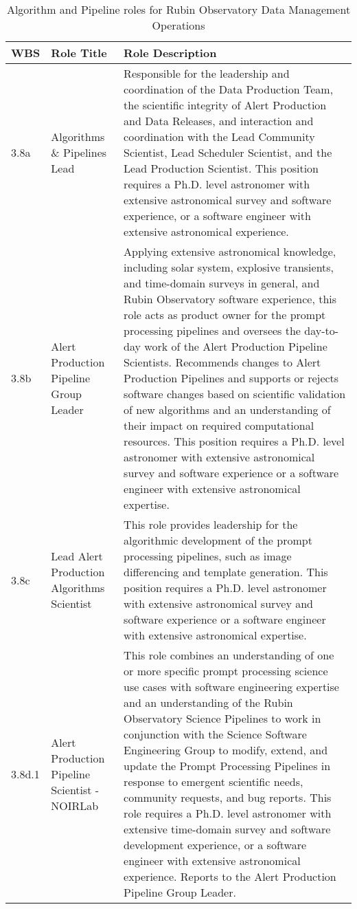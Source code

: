 \normalsize \begin{longtable} {|p{}|p{}|p{}|} \caption{Algorithm and Pipeline roles for Rubin Observatory Data Management Operations \label{tab:aproles}}\\ 
\hline 
\textbf{WBS}&\textbf{Role Title}&\textbf{Role Description} \\ \hline
{3.8a}&{Algorithms \& Pipelines Lead}&{Responsible for the leadership and coordination of the Data Production Team, the scientific integrity of Alert Production and Data Releases, and interaction and coordination with the Lead Community Scientist, Lead Scheduler Scientist, and the Lead Production Scientist. This position requires a Ph.D. level astronomer with extensive astronomical survey and software experience, or a software engineer with extensive astronomical experience.} \\ \hline
{3.8b}&{Alert Production Pipeline Group Leader}&{Applying extensive astronomical knowledge, including solar system, explosive transients, and time-domain surveys in general, and Rubin Observatory software experience, this role acts as product owner for the prompt processing pipelines and oversees the day-to-day work of the Alert Production Pipeline Scientists. Recommends changes to Alert Production Pipelines and supports or rejects software changes based on scientific validation of new algorithms and an understanding of their impact on required computational resources. This position requires a Ph.D. level astronomer with extensive astronomical survey and software experience or a software engineer with extensive astronomical expertise.} \\ \hline
{3.8c}&{Lead Alert Production Algorithms Scientist}&{This role provides leadership for the algorithmic development of the prompt processing pipelines, such as image differencing and template generation. This position requires a Ph.D. level astronomer with extensive astronomical survey and software experience or a software engineer with extensive astronomical expertise.} \\ \hline
{3.8d.1}&{Alert Production Pipeline Scientist - NOIRLab}&{This role combines an understanding of one or more specific prompt processing science use cases with software engineering expertise and an understanding of the Rubin Observatory Science Pipelines to work in conjunction with the Science Software Engineering Group to modify, extend, and update the Prompt Processing Pipelines in response to emergent scientific needs, community requests, and bug reports. This role requires a Ph.D. level astronomer with extensive time-domain survey and software development experience, or a software engineer with extensive astronomical experience. Reports to the Alert Production Pipeline Group Leader.} \\ \hline

\end{longtable}
